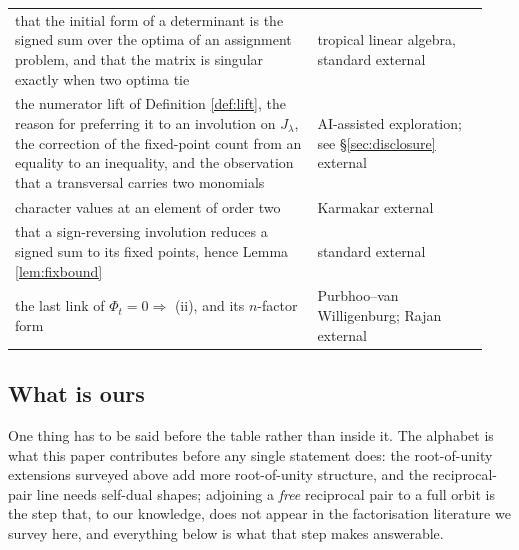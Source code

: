 \documentclass[11pt,reqno]{amsart}
\newcommand{\stext}{\textcolor{hext}{\small external}}
\theoremstyle{plain}
\theoremstyle{definition}
\begin{document}
\begin{longtable}{@{}>{\raggedright\arraybackslash}p{0.60\linewidth}%
                   >{\raggedright\arraybackslash}p{0.34\linewidth}@{}}
that the initial form of a determinant is the signed sum over the optima of an assignment problem,
and that the matrix is singular exactly when two optima tie & tropical linear algebra, standard
\cite{TropCramer} \stext\\
the numerator lift of Definition \ref{def:lift}, the reason for preferring it to an
involution on $J_\lambda$, the correction of the fixed-point count from an equality to an
inequality, and the observation that a transversal carries two monomials & AI-assisted
exploration; see \S\ref{sec:disclosure} \stext\\
character values at an element of order two & Karmakar \cite{Kar24} \stext\\
that a sign-reversing involution reduces a signed sum to its fixed points, hence Lemma
\ref{lem:fixbound} & standard \stext\\
the last link of $\Phi_t=0\Rightarrow$ (ii), and its $n$-factor form & Purbhoo--van Willigenburg;
Rajan \cite{PvW,Rajan} \stext\\
\bottomrule
\end{longtable}
\endgroup

\subsection*{What is ours}

One thing has to be said before the table rather than inside it. The alphabet is what this paper
contributes before any single statement does: the root-of-unity extensions surveyed above add more root-of-unity
structure, and the reciprocal-pair line needs self-dual shapes; adjoining a \emph{free} reciprocal
pair to a full orbit is the step that, to our knowledge, does not appear in the factorisation
literature we survey here, and everything below is what that step makes answerable.
\end{document}

